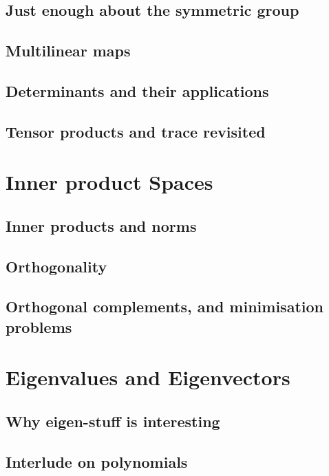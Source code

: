 \documentclass{book}
\theoremstyle{plain}
\theoremstyle{definition}
\theoremstyle{remark}
\begin{document}
\section{Just enough about the symmetric group}

\section{Multilinear maps}

\section{Determinants and their applications}

\section{Tensor products and trace revisited}

\chapter{Inner product Spaces}

\section{Inner products and norms}

\section{Orthogonality}

\section{Orthogonal complements, and minimisation problems}

\chapter{Eigenvalues and Eigenvectors}

\section{Why eigen-stuff is interesting}

\section{Interlude on polynomials}
\end{document}
